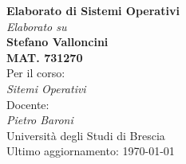 \documentclass[a4paper,11pt]{article}
\begin{document}
\begin{titlepage}
	\begin{center}
		{\huge\bfseries Elaborato di Sistemi Operativi\\}
	    \vspace{0.5cm}
	    {\Large \textit{Elaborato su} \\}
		\vspace{1.5cm}
		{\Large\bfseries Stefano Valloncini \\}
		\vspace{0.5cm}
		{\small\bfseries\textsc{MAT. 731270} \\}
		\vspace{2cm}
		{Per il corso:}\\[5pt]
		\emph{{Sitemi Operativi}}\\[0.5cm]
		{ Docente: }\\[5pt]
		\emph{{Pietro Baroni}}\\[2cm]
		\vfill
		{Università degli Studi di Brescia}\\[10pt]
		{Ultimo aggiornamento: \today}
	\end{center}
\end{titlepage}

\thispagestyle{empty}
\begin{flushright}
{\itshape } %
\textsc{ }  %
\end{flushright}
\newpage

\tableofcontents
\newpage
{}

\setlength{\headheight}{13.59999pt}
\pagestyle{fancy}



\end{document}

